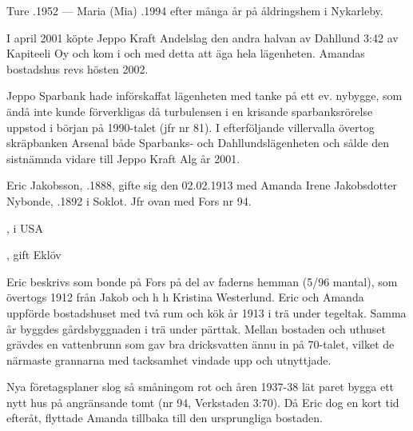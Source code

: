 Ture .1952 --- Maria (Mia) .1994 efter många år på åldringshem i Nykarleby.






I april 2001 köpte Jeppo Kraft Andelslag den andra halvan av Dahllund 3:42 av Kapiteeli Oy och kom i och med detta att äga hela lägenheten. Amandas bostadshus revs hösten 2002.


Jeppo Sparbank hade införskaffat lägenheten med tanke på ett ev. nybygge, som ändå inte kunde förverkligas då turbulensen i en krisande sparbanksrörelse uppstod i början på 1990-talet (jfr nr 81). I efterföljande villervalla övertog skräpbanken Arsenal både Sparbanks- och Dahllundslägenheten och sålde den sistnämnda vidare till Jeppo Kraft Alg år 2001.


\jhvspace{}


Eric Jakobsson, .1888, gifte sig den 02.02.1913 med Amanda Irene Jakobsdotter Nybonde, .1892 i Soklot. Jfr ovan med Fors nr 94.
\begin{jhchildren}
  \item {}, i USA
  \item {}
  \item {}, gift Eklöv
\end{jhchildren}

Eric beskrivs som bonde på Fors på del av faderns hemman (5/96 mantal), som övertogs 1912 från Jakob och h h Kristina Westerlund. Eric och Amanda uppförde bostadshuset med två rum och kök år 1913 i trä under tegeltak. Samma år byggdes gårdsbyggnaden i trä under pärttak. Mellan bostaden och uthuset grävdes en vattenbrunn som gav bra dricksvatten ännu in på 70-talet, vilket de närmaste grannarna med tacksamhet vindade upp och utnyttjade.

Nya företagsplaner slog så småningom rot och åren 1937-38 lät paret bygga ett nytt hus på angränsande tomt (nr 94, Verkstaden 3:70). Då Eric dog en kort tid efteråt, flyttade Amanda tillbaka till den ursprungliga bostaden.

